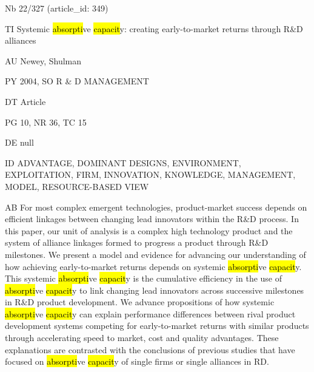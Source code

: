 \documentclass[a4paper]{article}
\begin{document}
\vspace*{-2cm}
Nb \tabto{0cm}22/327 (article\_id: 349)\par
TI \tabto{0cm}Systemic \hl{absorpti}ve \hl{capacit}y: creating early-to-market returns through R\&D alliances\par
AU \tabto{0cm}Newey, Shulman\par
PY \tabto{0cm}2004, SO R \& D MANAGEMENT\par
DT \tabto{0cm}Article\par
PG \tabto{0cm}10, NR 36, TC 15\par
DE \tabto{0cm}null\par
ID \tabto{0cm}ADVANTAGE, DOMINANT DESIGNS, ENVIRONMENT, EXPLOITATION, FIRM, INNOVATION, KNOWLEDGE, MANAGEMENT, MODEL, RESOURCE-BASED VIEW\par
AB \tabto{0cm}For most complex emergent technologies, product-market success depends on efficient linkages between changing lead innovators within the R\&D process. In this paper, our unit of analysis is a complex high technology product and the system of alliance linkages formed to progress a product through R\&D milestones. We present a model and evidence for advancing our understanding of how achieving early-to-market returns depends on systemic \hl{absorpti}ve \hl{capacit}y. This systemic \hl{absorpti}ve \hl{capacit}y is the cumulative efficiency in the use of \hl{absorpti}ve \hl{capacit}y to link changing lead innovators across successive milestones in R\&D product development. We advance propositions of how systemic \hl{absorpti}ve \hl{capacit}y can explain performance differences between rival product development systems competing for early-to-market returns with similar products through accelerating speed to market, cost and quality advantages. These explanations are contrasted with the conclusions of previous studies that have focused on \hl{absorpti}ve \hl{capacit}y of single firms or single alliances in RD.\par
\clearpage
\end{document}
